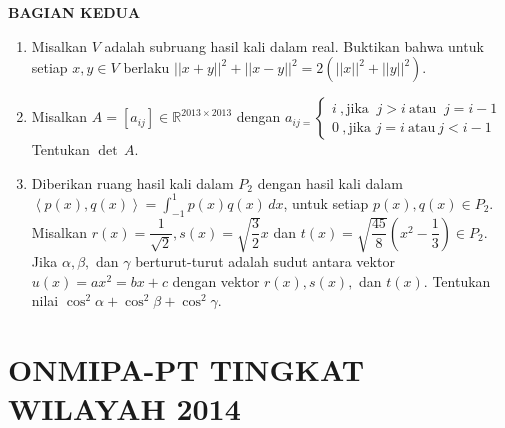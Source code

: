 \documentclass[12pt,twoside]{article}
\begin{document}
\newpage \textbf{BAGIAN KEDUA}
\begin{enumerate}
	\item Misalkan $V$ adalah subruang hasil kali dalam real. Buktikan bahwa untuk setiap $x,y \in V$ berlaku $||x+y||^2+||x-y||^2 = 2 (||x||^2+||y||^2)$.

	\item Misalkan $A = \left[ a_{ij} \right] \in \mathbb{R}^{2013 \times 2013}$ dengan $ a_{ij = }
		      \begin{cases}
			      i~,\text{jika }~j>i~\text{atau }~j = i-1 \\0~,\text{jika } j = i~\text{atau}~j<i-1
		      \end{cases}$
	      Tentukan $\det\,A$.

	\item Diberikan ruang hasil kali dalam $P_2$ dengan hasil kali dalam $\left< p(x),q(x) \right> =\displaystyle \int_{-1}^{1} p(x)q(x)\,dx$, untuk setiap $p(x),q(x) \in P_2$. Misalkan
	      $r(x) = \dfrac{1}{\sqrt{2}}, s(x) = \sqrt{\dfrac{3}{2}}x$ dan   $t(x) = \sqrt{\dfrac{45}{8}}  \left( x^2-\dfrac{1}{3} \right) \in P_2$. Jika $\alpha, \beta,$ dan $\gamma$ berturut-turut adalah sudut antara vektor $u(x)=ax^2=bx+c$ dengan vektor $r(x), s(x),$ dan $t(x)$. Tentukan nilai $\cos^2 \alpha + \cos^2 \beta + \cos^2 \gamma$.
\end{enumerate}


\newpage
{}
\section{ONMIPA-PT TINGKAT WILAYAH 2014}
\end{document}

